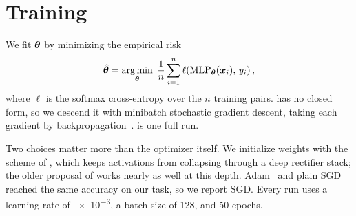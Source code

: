 \section{Training}
\label{sec:training}

We fit ${\bm{\theta}}$ by minimizing the empirical risk
\begin{equation}
  \label{eq:risk}
  \hat{{\bm{\theta}}} = \operatorname*{arg\,min}_{{\bm{\theta}}}\; \frac{1}{n} \sum_{i=1}^{n}
    \ell\!\left(\mathrm{MLP}_{{\bm{\theta}}}({\bm{x}}_i),\, y_i\right),
\end{equation}
where $\ell$ is the softmax cross-entropy over the $n$ training pairs.
 has no closed form, so we descend it with minibatch stochastic
gradient descent, taking each gradient by backpropagation~\citep{rumelhart1986}.
 is one full run.

\begin{algorithm}[t]
  \caption{Minibatch SGD training of an MLP.}
  \label{alg:train}
  
\end{algorithm}

Two choices matter more than the optimizer itself.
We initialize weights with the scheme of \citet{he2015}, which keeps activations
from collapsing through a deep rectifier stack; the older proposal of
\citet{glorot2010} works nearly as well at this depth.
Adam~\citep{kingma2015} and plain SGD reached the same accuracy on our task, so we
report SGD.
Every run uses a learning rate of \num{e-3}, a batch size of \num{128}, and
\num{50} epochs.
